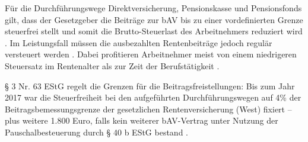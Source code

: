 \hspace{1cm}Für die Durchführungswege Direktversicherung, Pensionskasse und Pensionsfonds gilt, dass der Gesetzgeber die Beiträge zur bAV bis zu einer vordefinierten Grenze steuerfrei stellt und somit die Brutto-Steuerlast des Arbeitnehmers reduziert wird \cite[S. 109]{buttler2017einfuehrung}. Im Leistungsfall müssen die ausbezahlten Rentenbeiträge jedoch regulär versteuert werden \cite[S. 122]{buttler2017einfuehrung}. Dabei profitieren Arbeitnehmer meist von einem niedrigeren Steuersatz im Rentenalter als zur Zeit der Berufstätigkeit \cite{verbraucherzentrale}. 

§ 3 Nr. 63 EStG regelt die Grenzen für die Beitragsfreistellungen: Bis zum Jahr 2017 war die Steuerfreiheit bei den aufgeführten Durchführungswegen auf 4\% der Beitragsbemessungsgrenze der gesetzlichen Rentenversicherung (West) fixiert -- plus weitere 1.800 Euro, falls kein weiterer bAV-Vertrag unter Nutzung der Pauschalbesteuerung durch § 40 b EStG bestand \cite[S. 111]{buttler2017einfuehrung}. 

